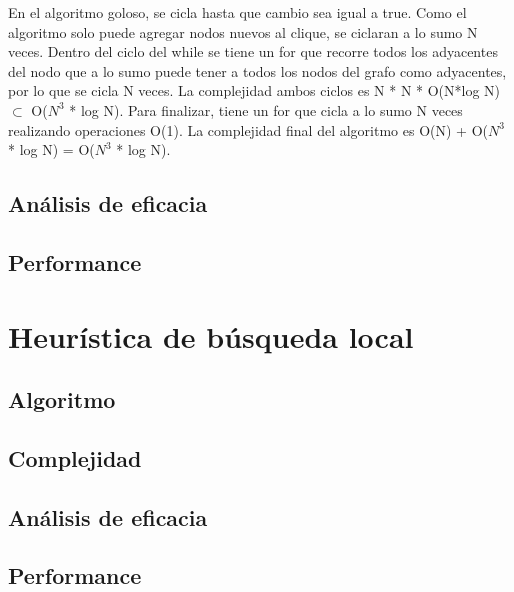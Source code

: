 \documentclass[a4paper, 10pt, twoside]{article}
\begin{document}
En el algoritmo goloso, se cicla hasta que cambio sea igual a true. Como el algoritmo solo puede agregar nodos nuevos al clique, se ciclaran a lo sumo N veces.
Dentro del ciclo del while se tiene un for que recorre todos los adyacentes del nodo que a lo sumo puede tener a todos los nodos del grafo como adyacentes, por lo que se cicla N veces.
La complejidad ambos ciclos es N * N * O(N*log N) $\subset$ O($N^3$ * log N).
Para finalizar, tiene un for que cicla a lo sumo N veces realizando operaciones O(1).
La complejidad final del algoritmo es O(N) + O($N^3$ * log N) = O($N^3$ * log N).

\subsection{Análisis de eficacia}

\subsection{Performance}


\newpage

\section{Heurística de búsqueda local}
\subsection{Algoritmo}
\subsection{Complejidad}
\subsection{Análisis de eficacia}
\subsection{Performance}

\end{document}
